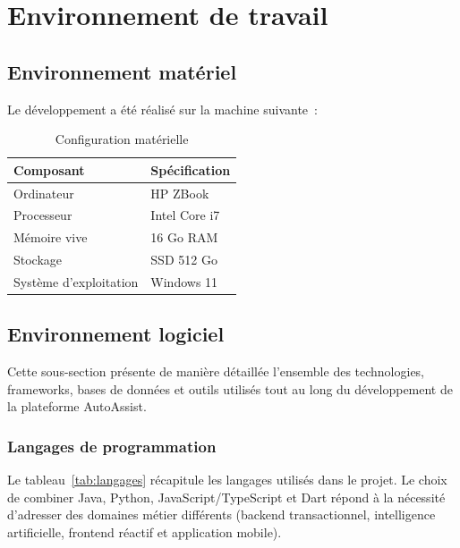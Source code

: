 \section{Environnement de travail}
\label{sec:env}

\subsection{Environnement mat\'{e}riel}

Le d\'{e}veloppement a \'{e}t\'{e} r\'{e}alis\'{e} sur la machine suivante~:

\begin{table}[H]
\centering
\caption{Configuration mat\'{e}rielle}
\label{tab:materiel}
\begin{tabular}{|p{4cm}|p{8cm}|}
\hline
\textbf{Composant} & \textbf{Sp\'{e}cification} \\
\hline
Ordinateur & HP ZBook \\
\hline
Processeur & Intel Core i7 \\
\hline
M\'{e}moire vive & 16 Go RAM \\
\hline
Stockage & SSD 512 Go \\
\hline
Syst\`{e}me d'exploitation & Windows 11 \\
\hline
\end{tabular}
\end{table}

\subsection{Environnement logiciel}

Cette sous-section pr\'{e}sente de mani\`{e}re d\'{e}taill\'{e}e l'ensemble des technologies, frameworks, bases de donn\'{e}es et outils utilis\'{e}s tout au long du d\'{e}veloppement de la plateforme AutoAssist.

\subsubsection{Langages de programmation}

Le tableau~\ref{tab:langages} r\'{e}capitule les langages utilis\'{e}s dans le projet. Le choix de combiner Java, Python, JavaScript/TypeScript et Dart r\'{e}pond \`{a} la n\'{e}cessit\'{e} d'adresser des domaines m\'{e}tier diff\'{e}rents (backend transactionnel, intelligence artificielle, frontend r\'{e}actif et application mobile).

